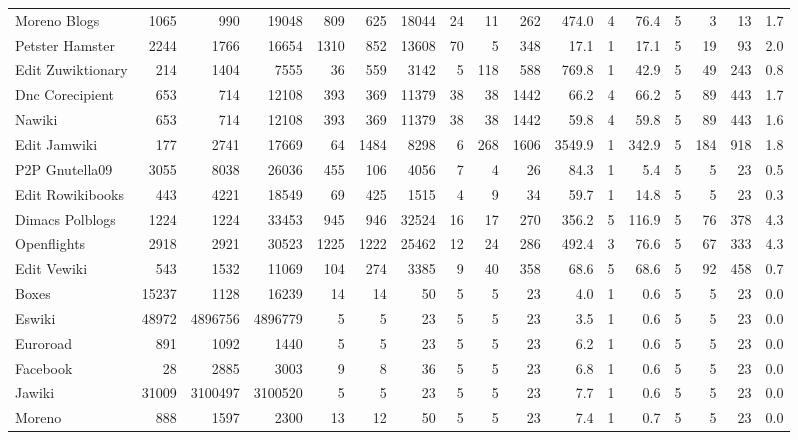 \documentclass{article}
\begin{document}
\begin{landscape}
\begin{table}[htbp]
\begin{tabular}{l *{16}{r}}
        Moreno Blogs & 1065 & 990 & 19048 & 809 & 625 & 18044 & 24 & 11 & 262 & 474.0 & 4 & 76.4 & 5 & 3 & 13 & 1.7 \\
        Petster Hamster & 2244 & 1766 & 16654 & 1310 & 852 & 13608 & 70 & 5 & 348 & 17.1 & 1 & 17.1 & 5 & 19 & 93 & 2.0 \\
        Edit Zuwiktionary & 214 & 1404 & 7555 & 36 & 559 & 3142 & 5 & 118 & 588 & 769.8 & 1 & 42.9 & 5 & 49 & 243 & 0.8 \\
        Dnc Corecipient & 653 & 714 & 12108 & 393 & 369 & 11379 & 38 & 38 & 1442 & 66.2 & 4 & 66.2 & 5 & 89 & 443 & 1.7 \\
        Nawiki & 653 & 714 & 12108 & 393 & 369 & 11379 & 38 & 38 & 1442 & 59.8 & 4 & 59.8 & 5 & 89 & 443 & 1.6 \\
        Edit Jamwiki & 177 & 2741 & 17669 & 64 & 1484 & 8298 & 6 & 268 & 1606 & 3549.9 & 1 & 342.9 & 5 & 184 & 918 & 1.8 \\
        \midrule
        P2P Gnutella09 & 3055 & 8038 & 26036 & 455 & 106 & 4056 & 7 & 4 & 26 & 84.3 & 1 & 5.4 & 5 & 5 & 23 & 0.5 \\
        Edit Rowikibooks & 443 & 4221 & 18549 & 69 & 425 & 1515 & 4 & 9 & 34 & 59.7 & 1 & 14.8 & 5 & 5 & 23 & 0.3 \\
        Dimacs Polblogs & 1224 & 1224 & 33453 & 945 & 946 & 32524 & 16 & 17 & 270 & 356.2 & 5 & 116.9 & 5 & 76 & 378 & 4.3 \\
        Openflights & 2918 & 2921 & 30523 & 1225 & 1222 & 25462 & 12 & 24 & 286 & 492.4 & 3 & 76.6 & 5 & 67 & 333 & 4.3 \\
        Edit Vewiki & 543 & 1532 & 11069 & 104 & 274 & 3385 & 9 & 40 & 358 & 68.6 & 5 & 68.6 & 5 & 92 & 458 & 0.7 \\
        \midrule
        Boxes & 15237 & 1128 & 16239 & 14 & 14 & 50 & 5 & 5 & 23 & 4.0 & 1 & 0.6 & 5 & 5 & 23 & 0.0 \\
        Eswiki & 48972 & 4896756 & 4896779 & 5 & 5 & 23 & 5 & 5 & 23 & 3.5 & 1 & 0.6 & 5 & 5 & 23 & 0.0 \\
        Euroroad & 891 & 1092 & 1440 & 5 & 5 & 23 & 5 & 5 & 23 & 6.2 & 1 & 0.6 & 5 & 5 & 23 & 0.0 \\
        Facebook & 28 & 2885 & 3003 & 9 & 8 & 36 & 5 & 5 & 23 & 6.8 & 1 & 0.6 & 5 & 5 & 23 & 0.0 \\
        Jawiki & 31009 & 3100497 & 3100520 & 5 & 5 & 23 & 5 & 5 & 23 & 7.7 & 1 & 0.6 & 5 & 5 & 23 & 0.0 \\
        Moreno & 888 & 1597 & 2300 & 13 & 12 & 50 & 5 & 5 & 23 & 7.4 & 1 & 0.7 & 5 & 5 & 23 & 0.0 \\

\end{tabular}
\end{table}
\end{landscape}
\end{document}
